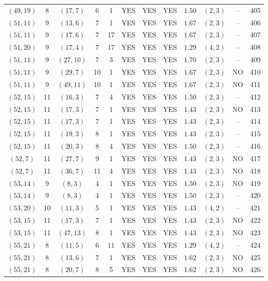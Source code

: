 \begin{longtable}{|c|c|c|c|c|c|c|c|c|c|c|c|}
$(49,19)$ & 8 & $(17,7)$ & 6 & 1 & YES & YES & YES & $1.50$ & $(2,3)$ & -- & 405\\
$(51,11)$ & 9 & $(13,6)$ & 7 & 1 & YES & YES & YES & $1.67$ & $(2,3)$ & -- & 406\\
$(51,11)$ & 9 & $(17,6)$ & 7 & 17 & YES & YES & YES & $1.67$ & $(2,3)$ & -- & 407\\
$(51,20)$ & 9 & $(17,4)$ & 7 & 17 & YES & YES & YES & $1.29$ & $(4,2)$ & -- & 408\\
$(51,11)$ & 9 & $(27,10)$ & 7 & 3 & YES & YES & YES & $1.70$ & $(2,3)$ & -- & 409\\
$(51,11)$ & 9 & $(29,7)$ & 10 & 1 & YES & YES & YES & $1.67$ & $(2,3)$ & NO & 410\\
$(51,11)$ & 9 & $(49,11)$ & 10 & 1 & YES & YES & YES & $1.67$ & $(2,3)$ & NO & 411\\
$(52,15)$ & 11 & $(16,3)$ & 7 & 4 & YES & YES & YES & $1.50$ & $(2,3)$ & -- & 412\\
$(52,15)$ & 11 & $(17,3)$ & 7 & 1 & YES & YES & YES & $1.43$ & $(2,3)$ & NO & 413\\
$(52,15)$ & 11 & $(17,3)$ & 7 & 1 & YES & YES & YES & $1.43$ & $(2,3)$ & -- & 414\\
$(52,15)$ & 11 & $(19,3)$ & 8 & 1 & YES & YES & YES & $1.43$ & $(2,3)$ & -- & 415\\
$(52,15)$ & 11 & $(20,3)$ & 8 & 4 & YES & YES & YES & $1.50$ & $(2,3)$ & -- & 416\\
$(52,7)$ & 11 & $(27,7)$ & 9 & 1 & YES & YES & YES & $1.43$ & $(2,3)$ & NO & 417\\
$(52,7)$ & 11 & $(36,7)$ & 11 & 4 & YES & YES & YES & $1.43$ & $(2,3)$ & NO & 418\\
$(53,14)$ & 9 & $(8,3)$ & 4 & 1 & YES & YES & YES & $1.50$ & $(2,3)$ & NO & 419\\
$(53,14)$ & 9 & $(8,3)$ & 4 & 1 & YES & YES & YES & $1.50$ & $(2,3)$ & -- & 420\\
$(53,20)$ & 10 & $(11,3)$ & 5 & 1 & YES & YES & YES & $1.43$ & $(4,2)$ & -- & 421\\
$(53,15)$ & 11 & $(17,3)$ & 7 & 1 & YES & YES & YES & $1.43$ & $(2,3)$ & NO & 422\\
$(53,15)$ & 11 & $(47,13)$ & 8 & 1 & YES & YES & YES & $1.43$ & $(2,3)$ & NO & 423\\
$(55,21)$ & 8 & $(11,5)$ & 6 & 11 & YES & YES & YES & $1.29$ & $(4,2)$ & -- & 424\\
$(55,21)$ & 8 & $(13,6)$ & 7 & 1 & YES & YES & YES & $1.62$ & $(2,3)$ & NO & 425\\
$(55,21)$ & 8 & $(20,7)$ & 8 & 5 & YES & YES & YES & $1.62$ & $(2,3)$ & NO & 426\\

\end{longtable}
